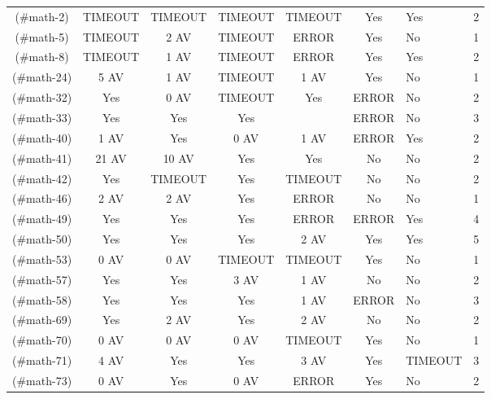 \begin{table}[!t]
{\begin{tabular}{|c|c|c|c|c|c|}
\hline
[M2](#math-2)     & TIMEOUT   & TIMEOUT   & TIMEOUT   & TIMEOUT   & Yes       & Yes       &      2 \\
[M5](#math-5)     & TIMEOUT   & 2 AV      & TIMEOUT   & ERROR     & Yes       & No        &      1 \\
[M8](#math-8)     & TIMEOUT   & 1 AV      & TIMEOUT   & ERROR     & Yes       & Yes       &      2 \\
[M24](#math-24)   & 5 AV      & 1 AV      & TIMEOUT   & 1 AV      & Yes       & No        &      1 \\
[M32](#math-32)   & Yes       & 0 AV      & TIMEOUT   & Yes       & ERROR     & No        &      2 \\
[M33](#math-33)   & Yes       & Yes       & Yes       &           & ERROR     & No        &      3 \\
[M40](#math-40)   & 1 AV      & Yes       & 0 AV      & 1 AV      & ERROR     & Yes       &      2 \\
[M41](#math-41)   & 21 AV     & 10 AV     & Yes       & Yes       & No        & No        &      2 \\
[M42](#math-42)   & Yes       & TIMEOUT   & Yes       & TIMEOUT   & No        & No        &      2 \\
[M46](#math-46)   & 2 AV      & 2 AV      & Yes       & ERROR     & No        & No        &      1 \\
[M49](#math-49)   & Yes       & Yes       & Yes       & ERROR     & ERROR     & Yes       &      4 \\
[M50](#math-50)   & Yes       & Yes       & Yes       & 2 AV      & Yes       & Yes       &      5 \\
[M53](#math-53)   & 0 AV      & 0 AV      & TIMEOUT   & TIMEOUT   & Yes       & No        &      1 \\
[M57](#math-57)   & Yes       & Yes       & 3 AV      & 1 AV      & No        & No        &      2 \\
[M58](#math-58)   & Yes       & Yes       & Yes       & 1 AV      & ERROR     & No        &      3 \\
[M69](#math-69)   & Yes       & 2 AV      & Yes       & 2 AV      & No        & No        &      2 \\
[M70](#math-70)   & 0 AV      & 0 AV      & 0 AV      & TIMEOUT   & Yes       & No        &      1 \\
[M71](#math-71)   & 4 AV      & Yes       & Yes       & 3 AV      & Yes       & TIMEOUT   &      3 \\
[M73](#math-73)   & 0 AV      & Yes       & 0 AV      & ERROR     & Yes       & No        &      2 \\

\end{tabular}}
\end{table}
